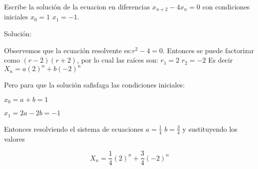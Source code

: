\documentclass{article}
\begin{document}
Escribe la solución de la ecuacion en diferencias $x_{n+2}-4x_n=0$ con condiciones iniciales $x_0=1$ $x_1=-1$.

Solución:

Observemos que la ecuación resolvente es:$r^2-4=0$. Entonces se puede factorizar como $(r-2)(r+2)$, por lo cual las raíces son: $r_1=2$ $r_2=-2$
Es decir $X_n=a(2)^n+b(-2)^n$

Pero para que la solución safisfaga las condiciones iniciales:

$x_0=a+b=1$

$x_1=2a-2b=-1$

Entonces resolviendo el sistema de ecuaciones $a=\frac{1}{4}$ $b=\frac{3}{4}$
y sustituyendo los valores

  $$X_n=\frac{1}{4}(2)^n + \frac{3}{4}(-2)^n$$
\end{document}
